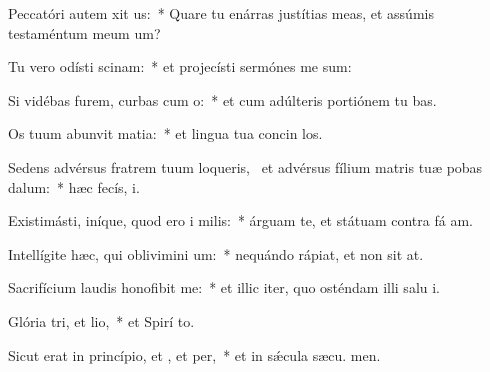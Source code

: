 \item Peccatóri autem xit us:~* Quare tu enárras justítias meas, et assúmis testaméntum meum   um?
\item Tu vero odísti scinam:~* et projecísti sermónes me sum:
\item Si vidébas furem, curbas cum o:~* et cum adúlteris portiónem tu bas.
\item Os tuum abunvit matia:~* et lingua tua concin los.
\item Sedens advérsus fratrem tuum loqueris,~\pscross{} et advérsus fílium matris tuæ pobas dalum:~* hæc fecís,  i.
\item Existimásti, iníque, quod ero i milis:~* árguam te, et státuam contra fá am.
\item Intellígite hæc, qui oblivimini um:~* nequándo rápiat, et non sit  at.
\item Sacrifícium laudis honofibit me:~* et illic iter, quo osténdam illi salu i.
\item Glória tri, et lio,~* et Spirí to.
\item Sicut erat in princípio, et , et per,~* et in sǽcula sæcu. men.
